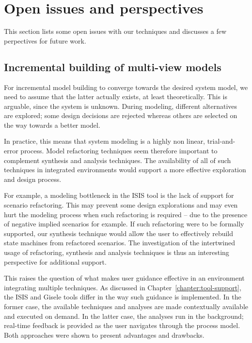 \section{Open issues and perspectives}

This section lists some open issues with our techniques and discusses a few perpectives for future work.

\subsection*{Incremental building of multi-view models}

For incremental model building to converge towards the desired system model, we need to assume that the latter actually exists, at least theoretically. This is arguable, since the system is unknown. During modeling, different alternatives are explored; some design decisions are rejected whereas others are selected on the way towards a better model.

In practice, this means that system modeling is a highly non linear, trial-and-error process. Model refactoring techniques seem therefore important to complement synthesis and analysis techniques. The availability of all of such techniques in integrated environments would support a more effective exploration and design process. 

For example, a modeling bottleneck in the ISIS tool is the lack of support for scenario refactoring. This may prevent some design explorations and may even hurt the modeling process when such refactoring is required -- due to the presence of negative implied scenarios for example. If such refactoring were to be formally supported, our  synthesis technique would allow the user to effectively rebuild state machines from refactored scenarios. The investigation of the intertwined usage of refactoring, synthesis and analysis techniques is thus an interesting perspective for additional support.

This raises the question of what makes user guidance effective in an environment integrating multiple techniques. As discussed in Chapter~\ref{chapter:tool-support}, the ISIS and Gisele tools differ in the way such guidance is implemented. In the former case, the available techniques and analyses are made contextually available and executed on demand. In the latter case, the analyses run in the background; real-time feedback is provided as the user navigates through the process model. Both approaches were shown to present advantages and drawbacks.

